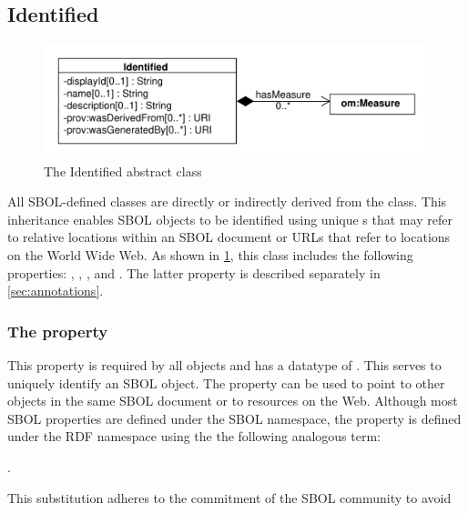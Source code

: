 \subsection {Identified}
\label{sec:Identified}

\begin{figure}[ht]
\begin{center}
\includegraphics[scale=0.6]{uml/identified}
\caption[]{The Identified abstract class}
\label{uml:identified}
\end{center}
\end{figure}

All SBOL-defined classes are directly or indirectly derived from the   class. This inheritance enables SBOL objects to be identified using unique s that may refer to relative locations within an SBOL document or URLs that refer to locations on the World Wide Web. As shown in \ref{uml:identified}, this class includes the following properties: , ,  , and . The latter property is described separately in \ref{sec:annotations}.

\subsubsection*{The  property}
\label{sec:identity}
This property is required by all  objects and has a datatype of . This  serves to uniquely identify an SBOL object. The  property can be used to point to other objects in the same SBOL document or to resources on the Web. Although most SBOL properties are defined under the SBOL namespace, the  property is defined under the RDF namespace using the the following analogous term:

.

This substitution adheres to the commitment of the SBOL community to avoid  


